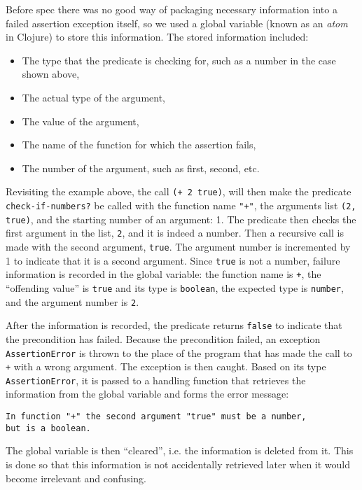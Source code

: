 \documentclass[12pt]{article}
\newcommand{\comment}[1]{{\bf \tt  {#1}}}
\newcommand{\emcomment}[1]{\textcolor{ForestGreen}{\comment{Elena: {#1}}}}
\begin{document}
Before spec there was no good way of packaging necessary information into a failed assertion 
exception itself, so we used a global variable (known as an {\it atom} in Clojure) to store this
information. The stored information included:
\begin{itemize}
\item The type that the predicate is checking for, such as a number in the case shown above,
\item The actual type of the argument,
\item The value of the argument,
\item The name of the function for which the assertion fails,
\item The number of the argument, such as first, second, etc. 
\end{itemize}
Revisiting the example above, the call {\tt (+ 2 true)}, will then make  the predicate 
\newline
{\tt check-if-numbers?} be called with the function name {\tt "+"}, the arguments list
{\tt (2, true)}, and the starting number of an argument: 1.   
The predicate then checks the first argument in the list, {\tt 2}, and it is indeed a number. 
Then a recursive call is made with the second argument, {\tt true}. The argument number is 
incremented by 1 to indicate that it is a second argument. Since {\tt true} is not a number,
failure information is recorded in the global variable: the function name is {\tt +}, the ``offending
value'' is {\tt true} and its type is {\tt boolean}, the expected type is {\tt number}, and the argument 
number is {\tt 2}. 

After the information is recorded, the predicate returns {\tt false} to indicate that the precondition 
has failed. Because the precondition failed, an exception {\tt AssertionError} is thrown to the 
place of the program that has made the call to {\tt +} with a wrong argument. 
The exception is then caught. Based on  its type {\tt AssertionError}, it is passed to a handling function 
that retrieves the information from the global variable and forms the error message:
\begin{verbatim}
In function "+" the second argument "true" must be a number, 
but is a boolean. 
\end{verbatim} 
The global variable is then ``cleared'', i.e. the information is deleted from it. This is done so that this 
information is not accidentally retrieved later when it would become irrelevant and confusing. 
\end{document}

